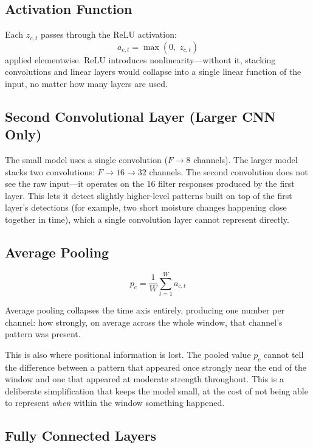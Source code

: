 \documentclass[11pt]{article}
\begin{document}
\subsection{Activation Function}

Each $z_{c,t}$ passes through the ReLU activation:
\begin{equation}
    a_{c,t} = \max(0,\; z_{c,t})
\end{equation}
applied elementwise. ReLU introduces nonlinearity---without it, stacking convolutions
and linear layers would collapse into a single linear function of the input, no
matter how many layers are used.

\subsection{Second Convolutional Layer (Larger CNN Only)}

The small model uses a single convolution ($F \to 8$ channels). The larger model
stacks two convolutions: $F \to 16 \to 32$ channels. The second convolution does
not see the raw input---it operates on the 16 filter responses produced by the first
layer. This lets it detect slightly higher-level patterns built on top of the first
layer's detections (for example, two short moisture changes happening close together
in time), which a single convolution layer cannot represent directly.

\subsection{Average Pooling}

\begin{equation}
    p_c = \frac{1}{W} \sum_{t=1}^{W} a_{c,t}
\end{equation}

Average pooling collapses the time axis entirely, producing one number per channel:
how strongly, on average across the whole window, that channel's pattern was present.

This is also where positional information is lost. The pooled value $p_c$ cannot
tell the difference between a pattern that appeared once strongly near the end of the
window and one that appeared at moderate strength throughout. This is a deliberate
simplification that keeps the model small, at the cost of not being able to represent
\emph{when} within the window something happened.

\subsection{Fully Connected Layers}
\end{document}
